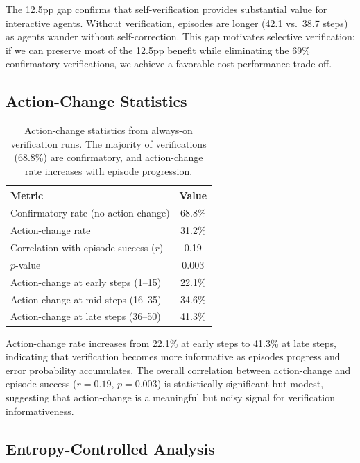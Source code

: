 \documentclass{article}
\begin{document}
The 12.5pp gap confirms that self-verification provides substantial value for interactive agents. Without verification, episodes are longer (42.1 vs.\ 38.7 steps) as agents wander without self-correction. This gap motivates selective verification: if we can preserve most of the 12.5pp benefit while eliminating the 69\% confirmatory verifications, we achieve a favorable cost-performance trade-off.

\subsection{Action-Change Statistics}

\begin{table}[h]
\centering
\caption{Action-change statistics from always-on verification runs. The majority of verifications (68.8\%) are confirmatory, and action-change rate increases with episode progression.}
\begin{tabular}{lc}
\toprule
Metric & Value \\
\midrule
Confirmatory rate (no action change) & 68.8\% \\
Action-change rate & 31.2\% \\
Correlation with episode success ($r$) & 0.19 \\
$p$-value & 0.003 \\
Action-change at early steps (1--15) & 22.1\% \\
Action-change at mid steps (16--35) & 34.6\% \\
Action-change at late steps (36--50) & 41.3\% \\
\bottomrule
\end{tabular}
\label{tab:actionchange}
\end{table}

Action-change rate increases from 22.1\% at early steps to 41.3\% at late steps, indicating that verification becomes more informative as episodes progress and error probability accumulates. The overall correlation between action-change and episode success ($r = 0.19$, $p = 0.003$) is statistically significant but modest, suggesting that action-change is a meaningful but noisy signal for verification informativeness.

\subsection{Entropy-Controlled Analysis}
\end{document}
